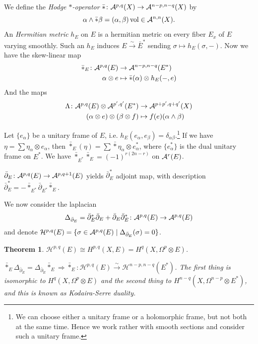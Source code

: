 \documentclass[A4paper, british, reqno]{amsart}
\theoremstyle{darkgreentheorem}
\newtheorem{thm}{Theorem}[section]
\theoremstyle{darkbluedefinition}
\theoremstyle{darkredexample}
\theoremstyle{remark}
\DeclareMathOperator{\vol}{vol}
\renewcommand{\H}{\mathcal{H}}
\newcommand{\1}{\mathbbm{1}}
\newcommand{\ot}{\otimes}
\begin{document}
We define the \textit{Hodge $*$-operator} $\bar{*}\colon \mathcal{A}^{p,q}(X)\to \mathcal{A}^{n-p,n-q}(X)$ by
\[ \alpha\wedge \bar{*}\beta = (\alpha,\beta)\vol \in \calA^{n,n}(X).\]
An \textit{Hermitian metric} $h_{E}$ on $E$ is a hermitian metric on every fiber $E_{x}$ of $E$ varying smoothly.
Such an $h_{E}$ induces $E\xrightarrow{\sim} \bar{E}^{*}$ sending $\sigma \mapsto h_{E}(\sigma,-)$.
Now we have the skew-linear map
\begin{align*}
    \bar{*}_{E}\colon \calA^{p,q}(E) &\to \calA^{n-p,n-q}(E^{*}) \\
    \alpha \ot e &\mapsto \bar{*}(\alpha)\ot h_{E}(-,e)
\end{align*}
And the maps
\begin{align*}
    \Lambda \colon \calA^{p,q}(E)\ot \calA^{p',q'}(E^{*}) & \to \calA^{p+p',q+q'}(X) \\
    (\alpha \ot e)\ot (\beta \ot f) & \mapsto f(e)(\alpha\wedge \beta)
\end{align*}

Let $\{ e_{\alpha }\}$ be a unitary frame of $E$, i.e. $h_{E}(e_{\alpha},e_{\beta})=\delta_{\alpha\beta}$.\footnote{We can choose either a unitary frame or a holomorphic frame, but not both at the same time. Hence we work rather with smooth sections and consider such a unitary frame.}
If we have $\eta=\sum \eta_{\alpha}\ot e_{\alpha}$, then $\bar{*}_{E}(\eta)=\sum \bar{*}\eta_{\alpha}\ot e_{\alpha}^{*}$, where $\{ e_{\alpha}^{*}\}$ is the dual unitary frame on $E^{*}$.
We have $\bar{*}_{E^{*}}\bar{*}_{E}=(-1)^{r(2n-r)}$ on $\mathcal{A}^{r}(E)$.

$\bar{\partial }_{E}\colon \mathcal{A}^{p,q}(E)\to \mathcal{A}^{p,q+1}(E)$ yields $\bar{\partial }_{E}^{*}$ adjoint map, with description $\bar{\partial }_{E}^{*}=-\bar{*}_{E^{*}}\bar{\partial }_{E^{*}}\bar{*}_{E}$.

We now consider the laplacian
\[\Delta_{\bar{\partial}_{E}}=\bar{\partial}_{E}^{*}\bar{\partial}_{E} +\bar{\partial }_{E}\bar{\partial}_{E}^{*}\colon \mathcal{A}^{p,q}(E)\to \mathcal{A}^{p,q}(E)\]
and denote $\H^{p,q}(E)=\{\sigma \in \calA^{p,q}(E)\mid \Delta_{\bar{\partial }_{E}}(\sigma )=0\}$.

\begin{thm}
    $\H^{p,q}(E)\cong H^{p,q}(X,E)=H^{q}(X,\Omega^{p}\ot E)$.
    
    $\bar{*}_{E}\Delta_{\bar{\partial}_{E}}=\Delta_{\bar{\partial }_{E}}\bar{*}_{E} \Rightarrow \bar{*}_{E}\colon \H^{p,q}(E)\xrightarrow{\sim}\H^{n-p,n-q}(E^{*})$.
    The first thing is isomorphic to $H^{q}(X,\Omega^{p}\ot E)$ and the second thing to $H^{n-q}(X,\Omega^{n-p}\ot E^{*})$, and this is known as \textit{Kodaira-Serre duality}.
\end{thm}
\end{document}
